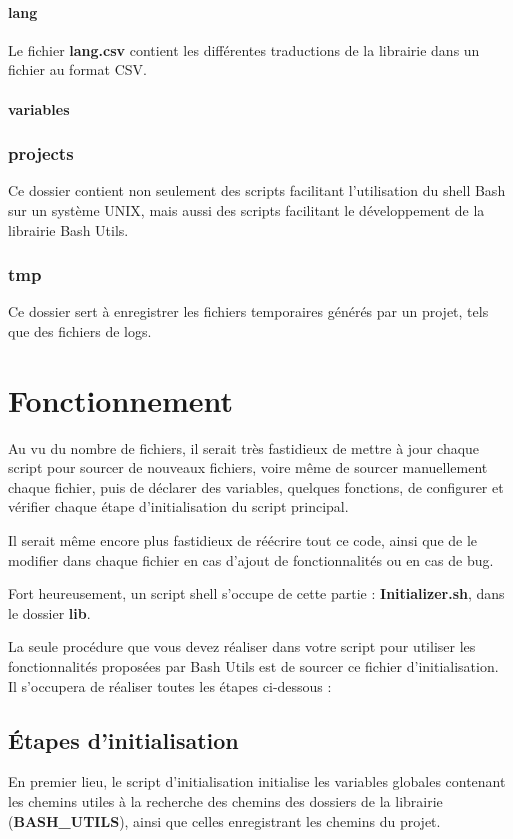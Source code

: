 \documentclass[a4paper,10pt]{article}
\begin{document}
\paragraph{lang}
Le fichier \textbf{lang.csv} contient les différentes traductions de la librairie dans un fichier au format CSV.

\paragraph{variables}

\subsubsection{projects}
Ce dossier contient non seulement des scripts facilitant l'utilisation du shell Bash sur un système UNIX, mais aussi des scripts facilitant le développement de la librairie Bash Utils.

\subsubsection{tmp}
Ce dossier sert à enregistrer les fichiers temporaires générés par un projet, tels que des fichiers de logs.


\section{Fonctionnement}
Au vu du nombre de fichiers, il serait très fastidieux de mettre à jour chaque script pour sourcer de nouveaux fichiers, voire même de sourcer manuellement chaque fichier, puis de déclarer des variables, quelques fonctions, de configurer et vérifier chaque étape d'initialisation du script principal.

Il serait même encore plus fastidieux de réécrire tout ce code, ainsi que de le modifier dans chaque fichier en cas d'ajout de fonctionnalités ou en cas de bug.

Fort heureusement, un script shell s'occupe de cette partie : \textbf{Initializer.sh}, dans le dossier \textbf{lib}.

La seule procédure que vous devez réaliser dans votre script pour utiliser les fonctionnalités proposées par Bash Utils est de sourcer ce fichier d'initialisation. Il s'occupera de réaliser toutes les étapes ci-dessous :

\subsection{Étapes d'initialisation}
En premier lieu, le script d'initialisation initialise les variables globales contenant les chemins utiles à la recherche des chemins des dossiers de la librairie (\textbf{BASH\_UTILS}), ainsi que celles enregistrant les chemins du projet.
\end{document}
